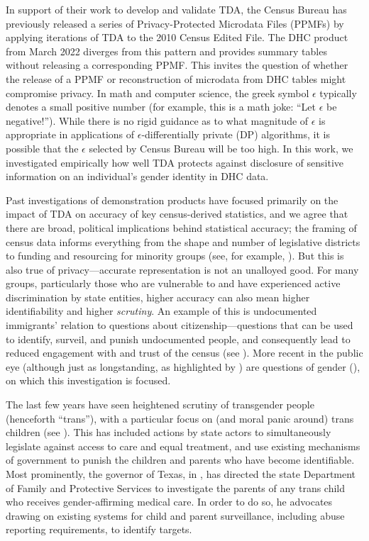 \documentclass{jpc} %
\theoremstyle{plain}\newtheorem{satz}[thm]{Satz} %
\begin{document}
In support of their work to develop and validate TDA,  the Census Bureau has previously released a series of Privacy-Protected Microdata Files (PPMFs) by applying iterations of TDA to the 2010 Census Edited File.  The DHC product from March 2022 diverges from this pattern and provides summary tables without releasing a corresponding PPMF.  This invites the question of whether the release of a PPMF or reconstruction of microdata from DHC tables might compromise privacy.  In math and computer science, the greek symbol $\epsilon$ typically denotes a small positive number (for example, this is a math joke: ``Let $\epsilon$ be negative!'').  While there is no rigid guidance as to what magnitude of $\epsilon$ is appropriate in applications of $\epsilon$-differentially private (DP) algorithms, it is possible that the $\epsilon$ selected by Census Bureau will be too high. In this work, we investigated empirically how well TDA protects against disclosure of sensitive information on an individual's gender identity in DHC data.


Past investigations of demonstration products have focused primarily on the impact of TDA on accuracy of key census-derived statistics,
and we agree that there are broad, political implications behind statistical accuracy; the framing of census data informs everything from the shape and number of legislative districts to funding and resourcing for minority groups (see, for example, \cite{thompson2012making}). But this is also true of privacy---accurate representation is not an unalloyed good. For many groups, particularly those who are vulnerable to and have experienced active discrimination by state entities, higher accuracy can also mean higher identifiability and higher \textit{scrutiny}. An example of this is undocumented immigrants' relation to questions about citizenship---questions that can be used to identify, surveil, and punish undocumented people, and consequently lead to reduced engagement with and trust of the census (see \cite{barreto2019}). More recent in the public eye (although just as longstanding, as highlighted by \cite{canaday2009straight}) are questions of gender (\cite{singer2015profusion}), on which this investigation is focused.

The last few years have seen heightened scrutiny of transgender people (henceforth ``trans''), with a particular focus on (and moral panic around) trans children (see \cite{slothouber2020trans}). This has included actions by state actors to simultaneously legislate against access to care and equal treatment, and use existing mechanisms of government to punish the children and parents who have become identifiable. Most prominently, the governor of Texas, in \cite{abbottletter}, has directed the state Department of Family and Protective Services to investigate the parents of any trans child who receives gender-affirming medical care. In order to do so, he advocates drawing on existing systems for child and parent surveillance, including abuse reporting requirements, to identify targets.
\end{document}
